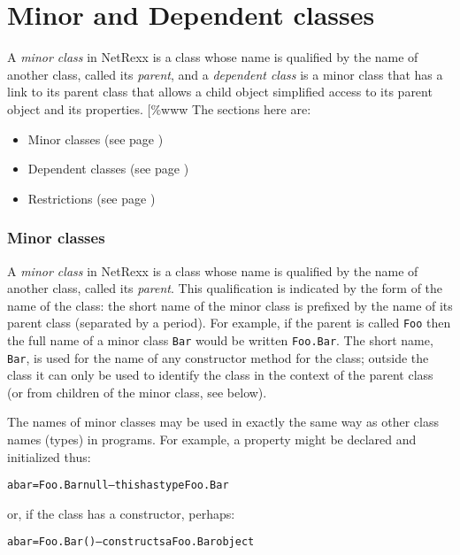 \chapter{Minor and Dependent classes}\label{"id"}
 
A \emph{minor class} in NetRexx is a class whose name is qualified by
the name of another class, called its \emph{parent}, and a
\emph{dependent class} is a minor class that has a link to its parent
class that allows a child object simplified access to its parent
object and its properties.
[\%www
 The sections here are:
\begin{itemize}
\item  Minor classes (see page \pageref{refsminorc}) 
\item  Dependent classes (see page \pageref{refsdepen}) 
\item  Restrictions (see page \pageref{refsminres}) 
\end{itemize}
\subsection{Minor classes}\label{"id"}
\index{,}
\index{,}
\index{,}
\index{,}
 
A \emph{minor class} in NetRexx is a class whose name is qualified by
the name of another class, called its \emph{parent}.
This qualification is indicated by the form of the name of the class:
the short name of the minor class is prefixed by the name of its parent
class (separated by a period).
For example, if the parent is called \texttt{Foo} then the full name of a
minor class \texttt{Bar} would be written \texttt{Foo.Bar}.
The short name, \texttt{Bar}, is used for the name of any constructor
method for the class; outside the class it can only be used to identify
the class in the context of the parent class (or from children of the
minor class, see below).
 
The names of minor classes may be used in exactly the same way as
other class names (types) in programs.  For example, a property might be
declared and initialized thus:
\begin{alltt}
abar=Foo.Bar null   -- this has type Foo.Bar
\end{alltt}
or, if the class has a constructor, perhaps:
\begin{alltt}
abar=Foo.Bar()      -- constructs a Foo.Bar object
\end{alltt}
 
